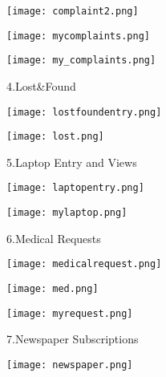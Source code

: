 \documentclass[a4paper,11pt]{article}
\begin{document}
\begin{center}
	\texttt{[image: complaint2.png]}
\end{center}

\newpage

\begin{center}
	\texttt{[image: mycomplaints.png]}
\end{center}

\begin{center}
	\texttt{[image: my\_complaints.png]}
\end{center}

\newpage

4.Lost\&Found

\begin{center}
	\texttt{[image: lostfoundentry.png]}
\end{center}

\begin{center}
	\texttt{[image: lost.png]}
\end{center}

\newpage

5.Laptop Entry and Views

\begin{center}
	\texttt{[image: laptopentry.png]}
\end{center}

\begin{center}
	\texttt{[image: mylaptop.png]}
\end{center}

\newpage

6.Medical Requests

\begin{center}
	\texttt{[image: medicalrequest.png]}
\end{center}

\begin{center}
	\texttt{[image: med.png]}
\end{center}

\newpage

\begin{center}
	\texttt{[image: myrequest.png]}
\end{center}

7.Newspaper Subscriptions

\begin{center}
	\texttt{[image: newspaper.png]}
\end{center}
\end{document}
